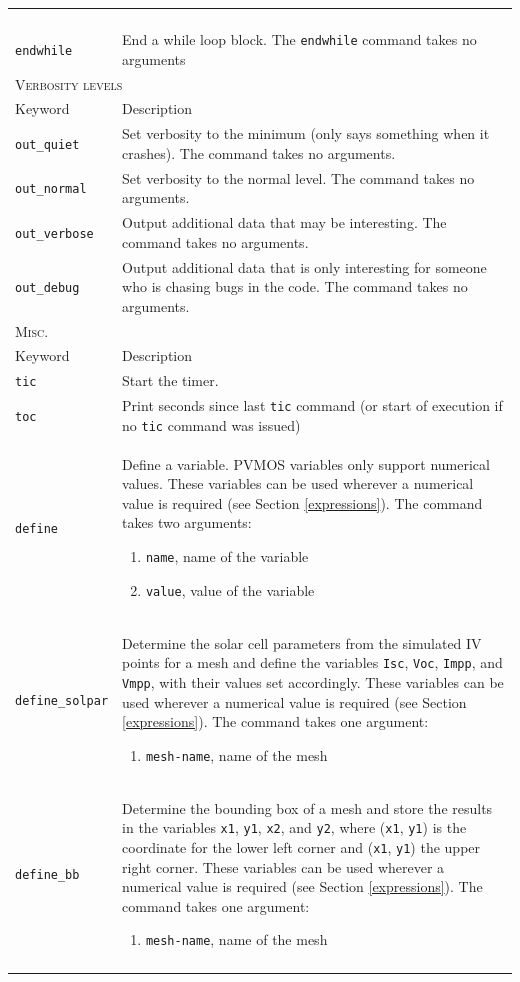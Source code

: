 \documentclass[noshowpacs,preprintnumbers,amsmath,amssymb, letter]{revtex4}
\begin{document}
\begin{longtable}{p{}p{}}
\begin{enumerate}
\end{enumerate}\\
\texttt{endwhile}	&  End a while loop block. The \texttt{endwhile} command takes no arguments\\
\multicolumn{2}{l}{\textsc{Verbosity levels}} \\*
\hline
Keyword & Description \\
\texttt{out\_quiet}	&  Set verbosity to the minimum (only says something when it crashes). The command takes no arguments.\\
\texttt{out\_normal}	&  Set verbosity to the normal level. The command takes no arguments.\\
\texttt{out\_verbose}	&  Output additional data that may be interesting. The command takes no arguments.\\
\texttt{out\_debug}	&  Output additional data that is only interesting for someone who is chasing bugs in the code. The command takes no arguments.\\
\multicolumn{2}{l}{\textsc{Misc.}} \\*
\hline
Keyword & Description \\
\texttt{tic}	&  Start the timer.\\
\texttt{toc}	&  Print seconds since last \texttt{tic} command (or start of execution if no \texttt{tic} command was issued)\\
\texttt{define}	&  Define a variable. PVMOS variables only support numerical values. These variables can be used wherever a numerical value is required (see Section \ref{expressions}). The command takes two arguments:
\begin{enumerate}
\item \texttt{name}, name of the variable
\item \texttt{value}, value of the variable
\end{enumerate}\\
\texttt{define\_solpar}	&  Determine the solar cell parameters from the simulated IV points for a mesh and define the variables \texttt{Isc}, \texttt{Voc}, \texttt{Impp}, and \texttt{Vmpp}, with their values set accordingly. These variables can be used wherever a numerical value is required (see Section \ref{expressions}). The command takes one argument:
\begin{enumerate}
\item \texttt{mesh-name}, name of the mesh
\end{enumerate}\\
\texttt{define\_bb}	&  Determine the bounding box of a mesh and store the results in the variables \texttt{x1}, \texttt{y1}, \texttt{x2}, and \texttt{y2}, where (\texttt{x1}, \texttt{y1}) is the coordinate for the lower left corner and (\texttt{x1}, \texttt{y1}) the upper right corner. These variables can be used wherever a numerical value is required (see Section \ref{expressions}). The command takes one argument:
\begin{enumerate}
\item \texttt{mesh-name}, name of the mesh
\end{enumerate}\\
\hline
\\
\end{longtable}
\end{document}
